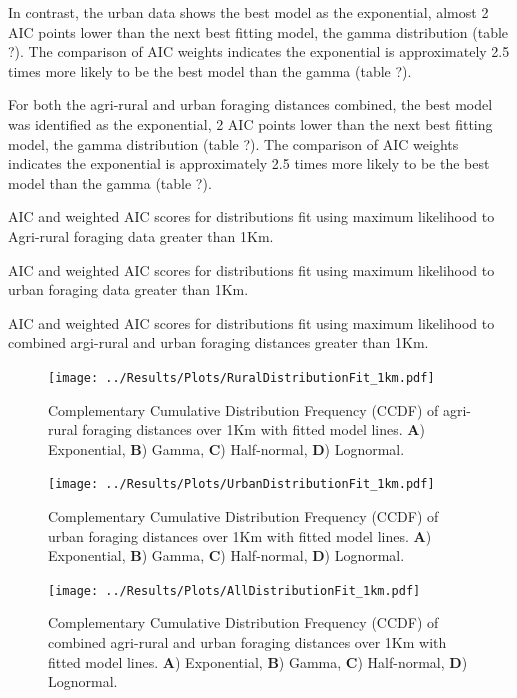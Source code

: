 \documentclass[11pt,usenames,dvipsnames]{article}
\begin{document}
In contrast, the urban data shows the best model as the exponential, almost 2 AIC points lower than the next best fitting model, the gamma distribution (table ?). The comparison of AIC weights indicates the exponential is approximately 2.5 times more likely to be the best model than the gamma (table ?).

For both the agri-rural and urban foraging distances combined, the best model was identified as the exponential, 2 AIC points lower than the next best fitting model, the gamma distribution (table ?). The comparison of AIC weights indicates the exponential is approximately 2.5 times more likely to be the best model than the gamma (table ?). 

\begin{table}[H]
	\centering
	\caption{AIC and weighted AIC scores for distributions fit using maximum likelihood to Agri-rural foraging data greater than 1Km.}
	
\end{table}
\begin{table}[H]
	\centering
	\caption{AIC and weighted AIC scores for distributions fit using maximum likelihood to urban foraging data greater than 1Km.}
	
\end{table}
\begin{table}[H]
	\centering
	\caption{AIC and weighted AIC scores for distributions fit using maximum likelihood to combined argi-rural and urban foraging distances greater than 1Km.}
	
\end{table}

\begin{figure}[H]
	\centering
	\texttt{[image: ../Results/Plots/RuralDistributionFit\_1km.pdf]}
	\caption{Complementary Cumulative Distribution Frequency (CCDF) of agri-rural foraging distances over 1Km with fitted model lines. \textbf{A}) Exponential, \textbf{B}) Gamma, \textbf{C}) Half-normal, \textbf{D}) Lognormal.}
\end{figure}
\begin{figure}[H]
	\centering
	\texttt{[image: ../Results/Plots/UrbanDistributionFit\_1km.pdf]}
	\caption{Complementary Cumulative Distribution Frequency (CCDF) of urban foraging distances over 1Km with fitted model lines. \textbf{A}) Exponential, \textbf{B}) Gamma, \textbf{C}) Half-normal, \textbf{D}) Lognormal.}
\end{figure}
\begin{figure}[H]
	\centering
	\texttt{[image: ../Results/Plots/AllDistributionFit\_1km.pdf]}
	\caption{Complementary Cumulative Distribution Frequency (CCDF) of combined agri-rural and urban foraging distances over 1Km with fitted model lines. \textbf{A}) Exponential, \textbf{B}) Gamma, \textbf{C}) Half-normal, \textbf{D}) Lognormal.}
\end{figure}
\end{document}
